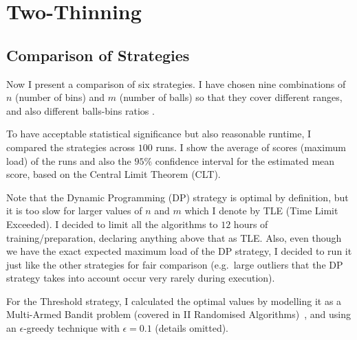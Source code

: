 


\section{Two-Thinning}


\subsection{Comparison of Strategies}

Now I present a comparison of six \TwoThinning strategies. I have chosen nine combinations of $n$ (number of bins) and $m$ (number of balls) so that they cover different ranges, and also different balls-bins ratios .


To have acceptable statistical significance but also reasonable runtime, I compared the strategies across $100$ runs. I show the average of scores (maximum load) of the runs and also the $95\%$ confidence interval for the estimated mean score, based on the Central Limit Theorem (CLT). 


Note that the Dynamic Programming (DP) strategy is optimal by definition, but it is too slow for larger values of $n$ and $m$ which I denote by TLE (Time Limit Exceeded). I decided to limit all the algorithms to $12$ hours of training/preparation, declaring anything above that as TLE. Also, even though we have the exact expected maximum load of the DP strategy, I decided to run it just like the other strategies for fair comparison (e.g.\ large outliers that the DP strategy takes into account occur very rarely during execution).


For the Threshold strategy, I calculated the optimal values by modelling it as a Multi-Armed Bandit problem (covered in II Randomised Algorithms)~\cite{katehakis1987multiarmedbandit}, and using an $\epsilon$-greedy technique with $\epsilon=0.1$ (details omitted).


